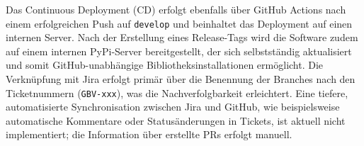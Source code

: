 \documentclass[12pt,oneside]{article}
\begin{document}
    \noindent
    Das Continuous Deployment (CD) erfolgt ebenfalls über GitHub Actions nach einem erfolgreichen Push auf \texttt{develop} und beinhaltet das Deployment auf einen internen Server. Nach der Erstellung eines Release-Tags wird die Software zudem auf einem internen PyPi-Server bereitgestellt, der sich selbstständig aktualisiert und somit GitHub-unabhängige Bibliotheksinstallationen ermöglicht.
    \newline
    Die Verknüpfung mit Jira erfolgt primär über die Benennung der Branches nach den Ticketnummern (\texttt{GBV-xxx}), was die Nachverfolgbarkeit erleichtert. Eine tiefere, automatisierte Synchronisation zwischen Jira und GitHub, wie beispielsweise automatische Kommentare oder Statusänderungen in Tickets, ist aktuell nicht implementiert; die Information über erstellte PRs erfolgt manuell.
\end{document}
